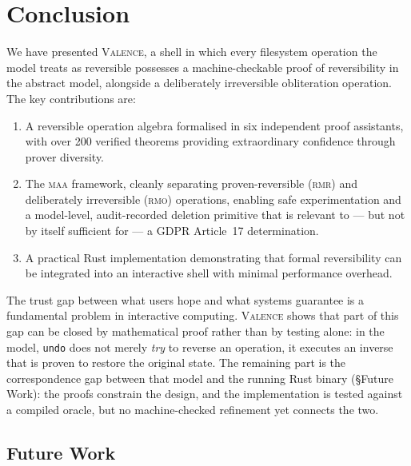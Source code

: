 \documentclass[11pt,a4paper]{article}
\newcommand{\valence}{\textsc{Valence}}
\newcommand{\rmr}{\textsc{rmr}}
\newcommand{\rmo}{\textsc{rmo}}
\newcommand{\maa}{\textsc{maa}}
\begin{document}
\section{Conclusion}
\label{sec:conclusion}

We have presented \valence{}, a shell in which every filesystem operation the
model treats as reversible possesses a machine-checkable proof of reversibility
in the abstract model, alongside a deliberately irreversible obliteration
operation. The key contributions are:

\begin{enumerate}
  \item A reversible operation algebra formalised in six independent proof
        assistants, with over 200 verified theorems providing extraordinary
        confidence through prover diversity.

  \item The \maa{} framework, cleanly separating proven-reversible (\rmr{})
        and deliberately irreversible (\rmo{}) operations, enabling safe
        experimentation and a model-level, audit-recorded deletion primitive
        that is relevant to --- but not by itself sufficient for --- a GDPR
        Article~17 determination.

  \item A practical Rust implementation demonstrating that formal
        reversibility can be integrated into an interactive shell with
        minimal performance overhead.
\end{enumerate}

The trust gap between what users hope and what systems guarantee is a
fundamental problem in interactive computing. \valence{} shows that part of
this gap can be closed by mathematical proof rather than by testing alone: in
the model, \texttt{undo} does not merely \emph{try} to reverse an operation,
it executes an inverse that is proven to restore the original state. The
remaining part is the correspondence gap between that model and the running
Rust binary (§Future Work): the proofs constrain the design, and the
implementation is tested against a compiled oracle, but no machine-checked
refinement yet connects the two.

\subsection{Future Work}
\end{document}
